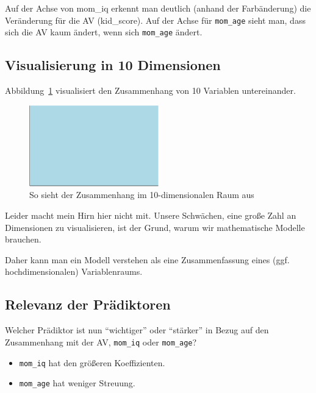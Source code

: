 \documentclass[
  a4paper,
  DIV=11]{scrreprt}
\providecommand{\tightlist}{%
  \setlength{\itemsep}{0pt}\setlength{\parskip}{0pt}}\usepackage{longtable,booktabs,array}
\theoremstyle{definition}
\theoremstyle{remark}
\begin{document}
Auf der Achse von mom\_iq erkennt man deutlich (anhand der Farbänderung)
die Veränderung für die AV (kid\_score). Auf der Achse für
\texttt{mom\_age} sieht man, dass sich die AV kaum ändert, wenn sich
\texttt{mom\_age} ändert.

\hypertarget{visualisierung-in-10-dimensionen}{%
\subsection{Visualisierung in 10
Dimensionen}\label{visualisierung-in-10-dimensionen}}

Abbildung~\ref{fig-ten-dims} visualisiert den Zusammenhang von 10
Variablen untereinander.

\begin{figure}

{\centering \includegraphics[width=0.5\textwidth,height=\textheight]{./metrische-AV_files/figure-pdf/fig-ten-dims-1.pdf}

}

\caption{\label{fig-ten-dims}So sieht der Zusammenhang im
10-dimensionalen Raum aus}

\end{figure}

Leider macht mein Hirn hier nicht mit. Unsere Schwächen, eine große Zahl
an Dimensionen zu visualisieren, ist der Grund, warum wir mathematische
Modelle brauchen.

Daher kann man ein Modell verstehen als eine Zusammenfassung eines (ggf.
hochdimensionalen) Variablenraums.

\hypertarget{relevanz-der-pruxe4diktoren}{%
\subsection{Relevanz der
Prädiktoren}\label{relevanz-der-pruxe4diktoren}}

Welcher Prädiktor ist nun ``wichtiger'' oder ``stärker'' in Bezug auf
den Zusammenhang mit der AV, \texttt{mom\_iq} oder \texttt{mom\_age}?

\begin{itemize}
\tightlist
\item
  \texttt{mom\_iq} hat den größeren Koeffizienten.
\item
  \texttt{mom\_age} hat weniger Streuung.
\end{itemize}
\end{document}
